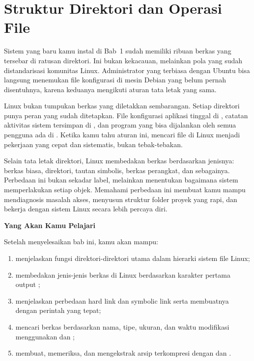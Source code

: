 
\chapter{Struktur Direktori dan Operasi File}
\label{ch:filesystem-ops}


Sistem yang baru kamu instal di Bab~1 sudah memiliki ribuan berkas yang tersebar di
ratusan direktori. Ini bukan kekacauan, melainkan pola yang sudah distandarisasi
komunitas Linux. Administrator yang terbiasa dengan Ubuntu bisa langsung menemukan
file konfigurasi di mesin Debian yang belum pernah disentuhnya, karena keduanya
mengikuti aturan tata letak yang sama.

 Linux bukan tumpukan berkas yang diletakkan sembarangan. Setiap direktori punya
peran yang sudah ditetapkan. File konfigurasi aplikasi tinggal di , catatan
aktivitas sistem tersimpan di , dan program yang bisa dijalankan oleh semua
pengguna ada di . Ketika kamu tahu aturan ini, mencari file di Linux menjadi
pekerjaan yang cepat dan sistematis, bukan tebak-tebakan.

Selain tata letak direktori, Linux membedakan berkas berdasarkan jenisnya: berkas biasa,
direktori, tautan simbolis, berkas perangkat, dan sebagainya. Perbedaan ini bukan sekadar
label, melainkan menentukan bagaimana sistem memperlakukan setiap objek. Memahami perbedaan
ini membuat kamu mampu mendiagnosis masalah akses, menyusun struktur folder proyek yang
rapi, dan bekerja dengan sistem Linux secara lebih percaya diri.

\textbf{Yang Akan Kamu Pelajari}

Setelah menyelesaikan bab ini, kamu akan mampu:

\begin{enumerate}
    \item menjelaskan fungsi direktori-direktori utama dalam hierarki sistem file Linux;
    \item membedakan jenis-jenis berkas di Linux berdasarkan karakter pertama output ;
    \item menjelaskan perbedaan hard link dan symbolic link serta membuatnya dengan perintah yang tepat;
    \item mencari berkas berdasarkan nama, tipe, ukuran, dan waktu modifikasi menggunakan  dan ;
    \item membuat, memeriksa, dan mengekstrak arsip terkompresi dengan  dan .
\end{enumerate}

